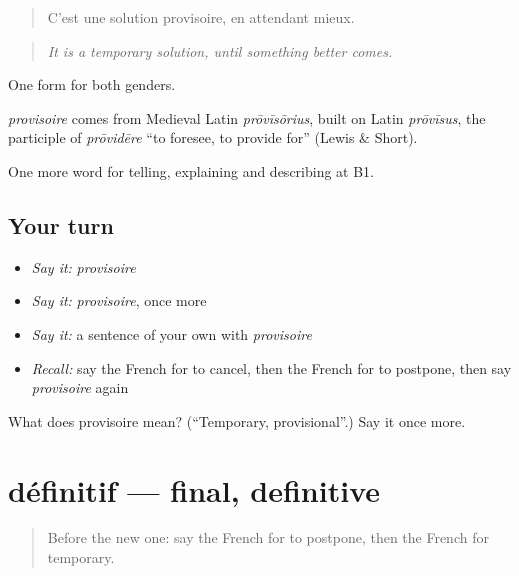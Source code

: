 \begin{quote}
C'est une solution provisoire, en attendant mieux.
\end{quote}

\begin{quote}
\emph{It is a temporary solution, until something better comes.}
\end{quote}

One form for both genders.

\begin{cousinweb}
\emph{provisoire} comes from Medieval Latin \emph{prōvīsōrius}, built on Latin \emph{prōvīsus}, the participle of \emph{prōvidēre} \textquotedblleft{}to foresee, to provide for\textquotedblright{} (Lewis \& Short).
\end{cousinweb}

\begin{grammarlens}[title={What you've built}]
One more word for telling, explaining and describing at B1.
\end{grammarlens}

\subsection*{Your turn}
\begin{itemize}
\raggedright
  \item \emph{Say it:} \emph{provisoire}
  \item \emph{Say it:} \emph{provisoire}, once more
  \item \emph{Say it:} a sentence of your own with \emph{provisoire}
  \item \emph{Recall:} say the French for to cancel, then the French for to postpone, then say \emph{provisoire} again
\end{itemize}

\begin{tcolorbox}[breakable,colback=teal!4,colframe=teal!35!black,title={Before you move on}]
What does provisoire mean? (\textquotedblleft{}Temporary, provisional\textquotedblright{}.) Say it once more.
\end{tcolorbox}
\section[définitif]{définitif — final, definitive}

\label{lesson:FR-C371-definitif}



\begin{quote}
Before the new one: say the French for to postpone, then the French for temporary.
\end{quote}

